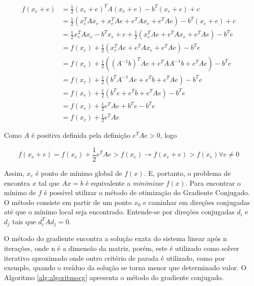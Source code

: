 \begin{align}
     f(x_e + e) & =  \frac{1}{2} (x_e + e)^T A (x_e + e) - b^T(x_e + e) + c  \nonumber\\
                & =  \frac{1}{2} (x_e^TAx_e + x_e^TAe + e^TAx_e + e^TAe )- b^T(x_e + e) + c  \nonumber\\
                & =  \frac{1}{2} x_e^TAx_e -b^Tx_e + c + \frac{1}{2} ( x_e^TAe + e^TAx_e + e^TAe ) - b^Te  \nonumber\\
                & =  f(x_e) + \frac{1}{2} ( x_e^TAe + e^TAx_e + e^TAe ) - b^Te  \nonumber\\
                & =  f(x_e) + \frac{1}{2} ( (A^{-1}b)^TAe + e^TAA^{-1}b + e^TAe ) - b^Te  \nonumber\\
                & =  f(x_e) + \frac{1}{2} ( b^TA^{-1}Ae + e^Tb + e^TAe ) - b^Te  \nonumber\\
                & =  f(x_e) + \frac{1}{2} ( b^Te + e^Tb + e^TAe ) - b^Te  \nonumber\\
                & =  f(x_e) + \frac{1}{2}  e^TAe  + b^Te - b^Te  \nonumber\\
                & =  f(x_e) + \frac{1}{2}  e^TAe \nonumber
\end{align}


Como $A$ é positiva definida pela definição $e^TAe  > 0$, logo

\begin{equation}
    f(x_e + e) = f(x_e) + \frac{1}{2}  e^TAe > f(x_e)\rightarrow  f(x_e + e) > f(x_e) \forall e \neq 0
\end{equation}


Assim, $x_e$ é ponto de mínimo global de $f(x)$. E, portanto, o problema de encontra $x$ tal que $Ax = b$ é equivalente a \textit{minimizar} $f(x)$. Para encontrar o mínimo de $f$ é possível utilizar o método de otimização do Gradiente Conjugado. O método consiste em partir de um ponto $x_0$ e caminhar em direções conjugadas até que o mínimo local seja encontrado. Entende-se por direções conjugadas $d_i$ e $d_j$ tais que $d_i^TAd_j=0$. 

O método do gradiente encontra a solução exata do sistema linear após n iterações, onde n é a dimensão da matriz, porém, este é utilizado como solver iterativo aproximado onde outro critério de parada é utilizado, como por exemplo, quando o resíduo da solução se torna menor que determinado valor. O Algoritmo \ref{alg:algoritmocg} apresenta o método do gradiente conjugado. 


